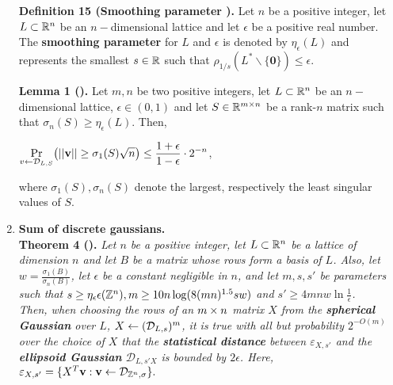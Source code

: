 \begin{enumerate}
	\textbf{Definition 15 (Smoothing parameter \cite{MiR04}).} Let $n$ be a positive integer,  let $L \subset \mathbb{R}^n$ be an $n-$dimensional lattice and let $\epsilon$ be a positive real number. The \textbf{smoothing parameter} for $L$ and $\epsilon$ is denoted by $\eta_\epsilon(L)$ and represents the smallest $s \in \mathbb{R}$ such that $\rho_{1/s}(L^* \backslash \{\textbf{0}\}) \leq \epsilon$.

	\textbf{Lemma 1 (\cite{AGH+12}).} Let $m,n$ be two positive integers,  let $L \subset \mathbb{R}^n$ be an $n-$dimensional lattice, $\epsilon \in (0,1)$ and let $S\in\mathbb{R}^{m\times n}$ be a rank-$n$ matrix such that $\sigma_n(S) \geq \eta_\epsilon(L)$. Then, 
	\begin{center}
		$\displaystyle{\Pr_{v \leftarrow\mathcal{D}_{L, S}}} \big( ||\textbf{v}|| \geq \sigma_1(S) \sqrt{n} \big)\leq \frac{1 + \epsilon}{1 - \epsilon} \cdot 2^{-n}$,
	\end{center}
where $\sigma_1(S), \sigma_n(S)$ denote the largest, respectively the least singular values of $S$.

\item \textbf{Sum of discrete gaussians.} \\
\textbf{Theorem 4 (\cite{GGH13}).} \textit{Let $n$ be a positive integer, let $L \subset \mathbb{R}^n$ be a lattice of dimension $n$ and let $B$ be a matrix whose rows form a basis of $L$. Also, let $w = \frac{\sigma_1(B)}{\sigma_n(B)}$, let $\epsilon$ be a constant negligible in $n$, and let $m, s, s'$ be parameters such that $s \geq \eta_\epsilon\epsilon({\mathbb Z}^n), m \geq 10n\log(8(mn)^{1.5}sw)$ and $s' \geq 4mnw \ln \frac{1}{\epsilon}$.\\
Then, when choosing the rows of an $m\times n$ matrix $X$ from the \textbf{spherical Gaussian} over $L$, $X \leftarrow (\mathcal{D}_{L, s})^m$, it is true with all but probability $2^{-O(m)}$ over the choice of $X$ that the \textbf{statistical distance} between $\varepsilon_{X, s'}$ and the \textbf{ellipsoid Gaussian} $\mathcal{D}_{L, s'X}$ is bounded by $2\epsilon$. Here,} $\varepsilon_{X,s'} = \{X^T \textbf{v} : \textbf{v} \leftarrow \mathcal{D}_{{\mathbb Z}^n, \sigma}\}.$

\end{enumerate}

